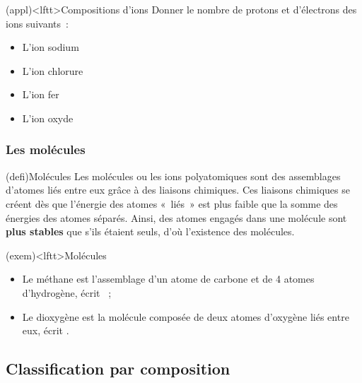 \documentclass[../../main/main.tex]{subfiles}
\begin{document}
\begin{tcb}[label=exem:ion](appl)<lftt>{Compositions d'ions}
	Donner le nombre de protons et d'électrons des ions suivants~:
	\smallbreak
	\begin{isd}
		\begin{itemize}
			\item L'ion sodium 
			      \smallbreak
			\item L'ion chlorure 
			      \smallbreak
		\end{itemize}
		\tcblower
		\begin{itemize}
			\item L'ion fer 
			      \smallbreak
			\item L'ion oxyde 
			      \smallbreak
		\end{itemize}
	\end{isd}
\end{tcb}

\subsubsection{Les molécules}
\begin{tcb}[label=def:molécules](defi){Molécules}
	Les molécules ou les ions polyatomiques sont des assemblages d'atomes
	liés entre eux grâce à des liaisons chimiques. Ces liaisons chimiques se
	créent dès que l'énergie des atomes «~liés~» est plus faible que la
	somme des énergies des atomes séparés.
	\smallbreak
	Ainsi, des atomes engagés dans une molécule sont \textbf{plus stables} que
	s'ils étaient seuls, d'où l'existence des molécules.
\end{tcb}

\begin{tcb}[label=exem:molécules](exem)<lftt>{Molécules}
	\begin{itemize}
		\item Le méthane est l'assemblage d'un atome de carbone et de 4
		      atomes d'hydrogène, écrit ~;
		\item Le dioxygène est la molécule composée de deux atomes d'oxygène
		      liés entre eux, écrit .
	\end{itemize}
\end{tcb}

\subsection{Classification par composition}
\end{document}
